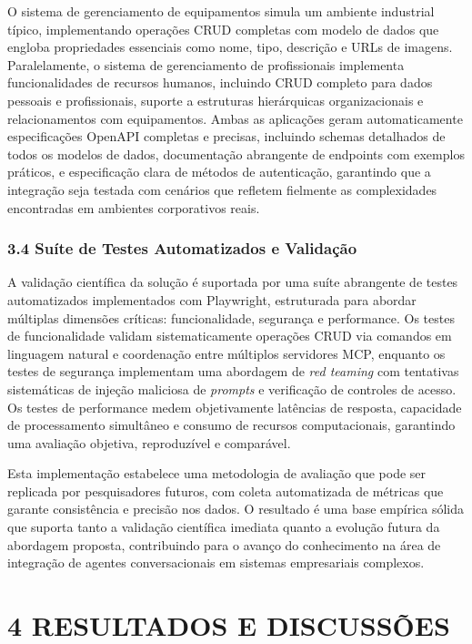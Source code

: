 \documentclass[
]{article}
\begin{document}
O sistema de gerenciamento de equipamentos simula um ambiente industrial
típico, implementando operações CRUD completas com modelo de dados que
engloba propriedades essenciais como nome, tipo, descrição e URLs de
imagens. Paralelamente, o sistema de gerenciamento de profissionais
implementa funcionalidades de recursos humanos, incluindo CRUD completo
para dados pessoais e profissionais, suporte a estruturas hierárquicas
organizacionais e relacionamentos com equipamentos. Ambas as aplicações
geram automaticamente especificações OpenAPI completas e precisas,
incluindo schemas detalhados de todos os modelos de dados, documentação
abrangente de endpoints com exemplos práticos, e especificação clara de
métodos de autenticação, garantindo que a integração seja testada com
cenários que refletem fielmente as complexidades encontradas em
ambientes corporativos reais.

\subsubsection{3.4 Suíte de Testes Automatizados e
Validação}\label{suuxedte-de-testes-automatizados-e-validauxe7uxe3o}

A validação científica da solução é suportada por uma suíte abrangente
de testes automatizados implementados com Playwright, estruturada para
abordar múltiplas dimensões críticas: funcionalidade, segurança e
performance. Os testes de funcionalidade validam sistematicamente
operações CRUD via comandos em linguagem natural e coordenação entre
múltiplos servidores MCP, enquanto os testes de segurança implementam
uma abordagem de \emph{red teaming} com tentativas sistemáticas de
injeção maliciosa de \emph{prompts} e verificação de controles de
acesso. Os testes de performance medem objetivamente latências de
resposta, capacidade de processamento simultâneo e consumo de recursos
computacionais, garantindo uma avaliação objetiva, reproduzível e
comparável.

Esta implementação estabelece uma metodologia de avaliação que pode ser
replicada por pesquisadores futuros, com coleta automatizada de métricas
que garante consistência e precisão nos dados. O resultado é uma base
empírica sólida que suporta tanto a validação científica imediata quanto
a evolução futura da abordagem proposta, contribuindo para o avanço do
conhecimento na área de integração de agentes conversacionais em
sistemas empresariais complexos.

\section{4 RESULTADOS E DISCUSSÕES}\label{resultados-e-discussuxf5es}
\end{document}
